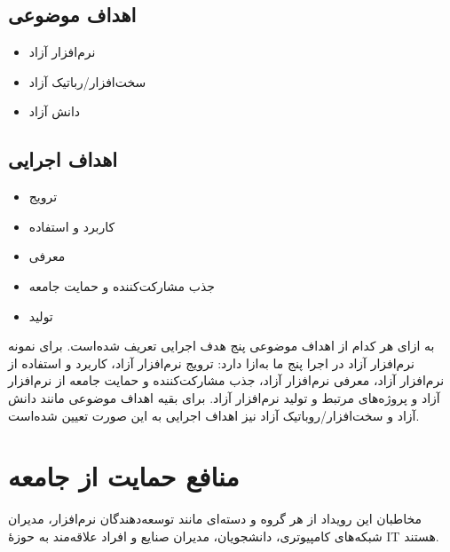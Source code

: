 \documentclass{article}
\begin{document}
\subsection{اهداف موضوعی}
\begin{flushright}

\begin{itemize}
\item نرم‌افزار آزاد
\item سخت‌افزار/رباتیک آزاد
\item دانش آزاد
\end{itemize}
\end{flushright}

\subsection{اهداف اجرایی}

\begin{flushright}
\begin{itemize}
\item ترویج
\item کاربرد و استفاده
\item معرفی
\item جذب مشارکت‌کننده و حمایت جامعه
\item تولید
\end{itemize}
\end{flushright}

به ازای هر کدام از اهداف موضوعی پنج هدف اجرایی تعریف شده‌است. برای نمونه نرم‌افزار آزاد در اجرا پنج ما به‌ازا دارد: ترویج نرم‌افزار آزاد، کاربرد و استفاده از نرم‌افزار آزاد، معرفی نرم‌افزار آزاد، جذب مشارکت‌کننده و حمایت جامعه از نرم‌افزار آزاد و پروژه‌های مرتبط و تولید نرم‌افزار آزاد. برای بقیه اهداف موضوعی مانند دانش آزاد و سخت‌افزار/روباتیک آزاد نیز اهداف اجرایی به این صورت تعیین شده‌است.

\section{منافع حمایت از جامعه}
مخاطبان این رویداد از هر گروه و دسته‌ای مانند توسعه‌دهندگان نرم‌افزار، مدیران شبکه‌های کامپیوتری، دانشجویان، مدیران صنایع و افراد علاقه‌مند به حوزهٔ IT  هستند.
\end{document}
